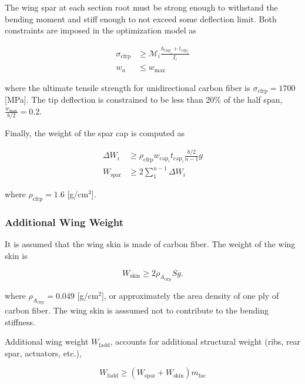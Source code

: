 The wing spar at each section root must be strong enough to withstand the bending moment and stiff enough to not exceed some deflection limit.  Both constraints are imposed in the optimization model as

\begin{align}
    \label{e:stresscont}
    \sigma_{\text{cfrp}} &\geq \mathcal{M}_i \frac{h_{\text{cap}_i}+t_{\text{cap}_i}}{I_i}\\
    \label{e:defcont}
    w_n &\leq w_{\text{max}}
\end{align}

where the ultimate tensile strength for unidirectional carbon fiber is $\sigma_{\text{cfrp}} = 1700$ [MPa].\cite{cfprop}
The tip deflection is constrained to be less than 20\% of the half span, $\frac{w_{\text{max}}}{b/2} = 0.2$.

Finally, the weight of the spar cap is computed as

\begin{align}
    \label{e:sparmass}
    \Delta W_i &\geq \rho_{\text{cfrp}} w_{\text{cap}_i}t_{\text{cap}_i} \frac{b/2}{n-1}g \\
    \label{e:sparmasssum}
    W_{\text{spar}} &\geq 2 \sum\limits_{1}^{n-1} \Delta W_i
\end{align}

where $\rho_{\text{cfrp}} = 1.6$ [g/cm$^3$].\cite{cfply}


\subsubsection{Additional Wing Weight}

It is assumed that the wing skin is made of carbon fiber.  The weight of the wing skin is 

\begin{equation}
    \label{e:wingskinweight}
    W_{\text{skin}} \geq 2 \rho_{A_{\text{cfrp}}} S g.
\end{equation}

where $\rho_{A_{\text{cfrp}}} = 0.049$ [g/cm$^2$], or approximately the area density of one ply of carbon fiber.\cite{cfply} The wing skin is asssumed not to contribute to the bending stiffness. 

Additional wing weight $W_{\text{fadd}}$, accounts for additional structural weight (ribs, rear spar, actuators, etc.),

\begin{equation}
    W_{\text{fadd}} \geq (W_{\text{spar}} + W_{\text{skin}}) m_{\text{fac}}
\end{equation}

